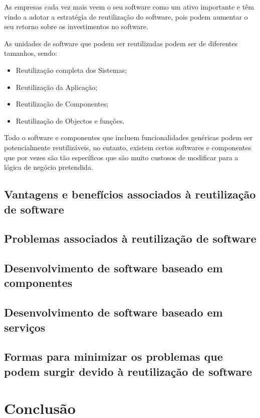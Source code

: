 \documentclass[runningheads]{llncs}
\begin{document}
As empresas cada vez mais veem o seu software como um ativo importante e têm vindo a  adotar a estratégia de reutilização do software, pois podem aumentar o seu retorno sobre os investimentos no software.\par
As unidades de software que podem ser reutilizadas podem ser de diferentes tamanhos, sendo:

\begin{itemize}
    \item Reutilização completa dos Sistemas;
    \item Reutilização da Aplicação;
    \item Reutilização de Componentes;
    \item Reutilização de Objectos e funções.
\end{itemize}

Todo o software e componentes que incluem funcionalidades genéricas podem ser potencialmente reutilizáveis, no entanto, existem certos softwares e componentes que por vezes são tão específicos que são muito custosos de modificar para a lógica de negócio pretendida.

\subsection{Vantagens e benefícios associados à reutilização de software}


\subsection{Problemas associados à reutilização de software}

\subsection{Desenvolvimento de software baseado em componentes}


\subsection{Desenvolvimento de software baseado em serviços}



\subsection{Formas para minimizar os problemas que podem surgir devido à reutilização de software}

\section{Conclusão}
\end{document}
